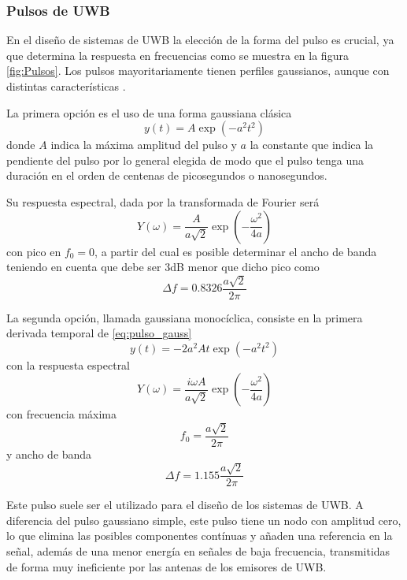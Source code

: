 \subsubsection{Pulsos de UWB}

En el diseño de sistemas de UWB la elección de la forma del pulso es crucial, ya que determina la respuesta en frecuencias como se muestra en la figura \ref{fig:Pulsos}.
Los pulsos mayoritariamente tienen perfiles gaussianos, aunque con distintas características \cite{Du}.

La primera opción es el uso de una forma gaussiana clásica
\begin{equation}\label{eq:pulso_gauss}
    y(t) = A\exp(-a^2 t^2)
\end{equation}
donde $A$ indica la máxima amplitud del pulso y $a$ la constante que indica la pendiente del pulso por lo general elegida de modo que el pulso tenga una duración en el orden de centenas de picosegundos o nanosegundos.

Su respuesta espectral, dada por la transformada de Fourier será    
\begin{equation}
    Y(\omega) = \frac{A}{a\sqrt{2}}\exp(-\frac{\omega^2}{4a})
\end{equation}
con pico en $f_0=0$, a partir del cual es posible determinar el ancho de banda teniendo en cuenta que debe ser 3dB menor que dicho pico como
\begin{equation}
    \Delta f = 0.8326\frac{a\sqrt{2}}{2\pi}
\end{equation}

La segunda opción, llamada gaussiana monocíclica, consiste en la primera derivada temporal de \eqref{eq:pulso_gauss}
\begin{equation}
    y(t) = -2 a^2 At\exp(-a^2 t^2)
\end{equation}
con la respuesta espectral
\begin{equation}
    Y(\omega) = \frac{i\omega A}{a\sqrt{2}}\exp(-\frac{\omega^2}{4a})
\end{equation}
con frecuencia máxima
\begin{equation}
    f_0 = \frac{a\sqrt{2}}{2\pi}
\end{equation}
y ancho de banda
\begin{equation}
    \Delta f = 1.155\frac{a\sqrt{2}}{2\pi}
\end{equation}

Este pulso suele ser el utilizado para el diseño de los sistemas de UWB.
A diferencia del pulso gaussiano simple, este pulso tiene un nodo con amplitud cero, lo que elimina las posibles componentes contínuas y añaden una referencia en la señal, además de una menor energía en señales de baja frecuencia, transmitidas de forma muy ineficiente por las antenas de los emisores de UWB.

